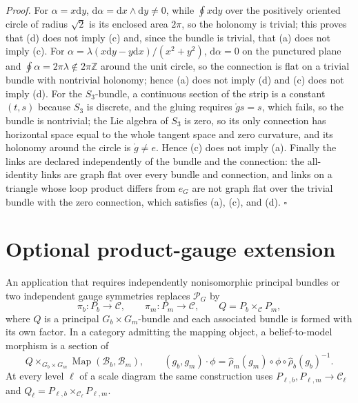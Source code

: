 \noindent\emph{Proof.}
For \(\alpha=x\mathrm dy\), \(\mathrm d\alpha=\mathrm dx\wedge\mathrm dy\neq0\), while \(\oint x\mathrm dy\) over the positively oriented
circle of radius \(\sqrt2\) is its enclosed area \(2\pi\), so the holonomy is trivial; this proves
that (d) does not imply (c) and, since the bundle is trivial, that (a) does not imply (c). For
\(\alpha=\lambda(x\mathrm dy-y\mathrm dx)/(x^2+y^2)\), \(\mathrm d\alpha=0\) on the punctured plane and
\(\oint\alpha=2\pi\lambda\notin2\pi\mathbb Z\) around the unit circle, so the connection is flat on
a trivial bundle with nontrivial holonomy; hence (a) does not imply (d) and (c) does not imply (d).
For the \(S_3\)-bundle, a continuous section of the strip is a constant \((t,s)\) because \(S_3\) is
discrete, and the gluing requires \(\mathring g s=s\), which fails, so the bundle is nontrivial; the Lie
algebra of \(S_3\) is zero, so its only connection has horizontal space equal to the whole tangent
space and zero curvature, and its holonomy around the circle is \(\mathring g\neq e\). Hence (c) does not
imply (a). Finally the links are declared independently of the bundle and the connection: the
all-identity links are graph flat over every bundle and connection, and links on a triangle whose loop
product differs from \(e_G\) are not graph flat over the trivial bundle with the zero connection,
which satisfies (a), (c), and (d). \hfill$\square$

\section{Optional product-gauge extension}
\label{sec:geo-product-extension}

An application that requires independently nonisomorphic principal bundles or two independent gauge
symmetries replaces \(\mathscr P_G\) by
\begin{equation}
\pi_b:P_b\to\mathcal C,
\qquad
\pi_m:P_m\to\mathcal C,
\qquad
Q=P_b\times_{\mathcal C}P_m,
\label{eq:geo-product-principal-extension}
\end{equation}
where \(Q\) is a principal \(G_b\times G_m\)-bundle and each associated bundle is formed with its own
factor. In a category admitting the mapping object, a belief-to-model morphism is a section of
\begin{equation}
Q\times_{G_b\times G_m}\operatorname{Map}(\mathcal B_b,\mathcal B_m),
\qquad
(g_b,g_m)\cdot\phi
=\widehat\rho_m(g_m)\circ\phi\circ\widehat\rho_b(g_b)^{-1}.
\label{eq:geo-product-cross-map-bundle}
\end{equation}
At every level \(\ell\) of a scale diagram the same construction uses
\(P_{\ell,b},P_{\ell,m}\to\mathcal C_\ell\) and \(Q_\ell=P_{\ell,b}\times_{\mathcal C_\ell}P_{\ell,m}\).

